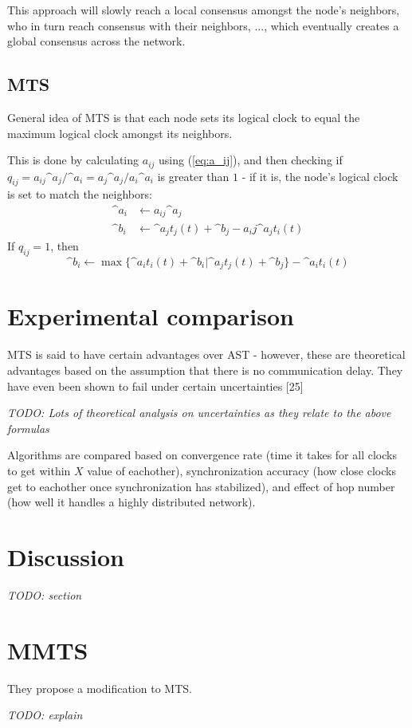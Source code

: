 \documentclass{article}
\begin{document}
This approach will slowly reach a local consensus amongst the node's neighbors, who in turn reach consensus with their neighbors, $...$, which eventually creates a global consensus across the network.

\subsection{MTS}

General idea of MTS is that each node sets its logical clock to equal the maximum logical clock amongst its neighbors.

This is done by calculating $a_{ij}$ using (\ref{eq:a_ij}), and then checking if $q_{ij} = a_{ij} \^{a}_j/\^{a}_i = a_j\^{a}_j / a_i\^{a}_i$ is greater than $1$ - if it is, the node's logical clock is set to match the neighbors:
\begin{align*}
    \^{a}_i &\leftarrow a_{ij}\^{a}_j \\
    \^{b}_i &\leftarrow \^{a}_j t_j(t) + \^{b}_j - a_ij \^a_j t_i(t)
\end{align*}
If $q_{ij} = 1$, then
$$ \^b_i \leftarrow \max\{\^a_i t_i(t) + \^b_i | \^a_j t_j(t) + \^b_j\} - \^a_i t_i(t) $$

\section{Experimental comparison}

MTS is said to have certain advantages over AST - however, these are theoretical advantages based on the assumption that there is no communication delay. They have even been shown to fail under certain uncertainties [25]

\textit{TODO: Lots of theoretical analysis on uncertainties as they relate to the above formulas}

Algorithms are compared based on convergence rate (time it takes for all clocks to get within $X$ value of eachother), synchronization accuracy (how close clocks get to eachother once synchronization has stabilized), and effect of hop number (how well it handles a highly distributed network).

\section{Discussion}

\textit{TODO: section}

\section{MMTS}

They propose a modification to MTS.

\textit{TODO: explain}
\end{document}
